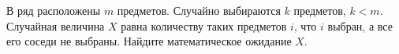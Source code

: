 \documentclass{article}
\begin{document}
В ряд расположены $m$ предметов. Случайно выбираются $k$ предметов, $k<m$. Случайная величина $X$ равна количеству таких предметов $i$, 
что $i$ выбран, а все его соседи не выбраны. Найдите математическое ожидание $X$.
\end{document}
